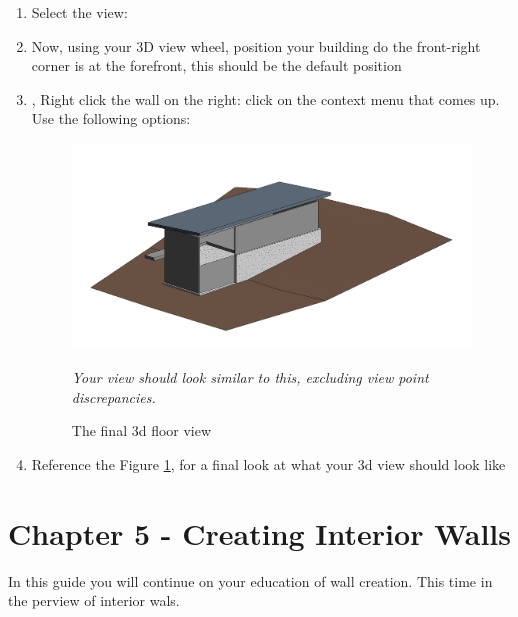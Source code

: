 \documentclass{tufte-book} %
\begin{document}
\begin{enumerate}
\begin{marginfigure}
		\caption[3D wall context menu]{What pops up here should be the caption menu when right clicking a wall. }
		\label{fig:revthreedfloorcontx}
	\end{marginfigure}
	\item Select the view:\\ 
	\item Now, using your 3D view wheel, position your building do the front-right corner is at the forefront, this should be the default position
	\item, Right click the wall on the right: click on the context menu that comes up. Use the following options: 
	\begin{figure}
		\includegraphics[width=\linewidth]{revit3dfloorview.png}
		\caption{The final 3d floor view}
		\emph{Your view should look similar to this, excluding view point discrepancies.}
		\label{fig:revthreedfloorfinal}
	\end{figure}
	\item Reference the Figure \ref{fig:revthreedfloorfinal}, for a final look at what your 3d view should look like
	 
\end{enumerate}

\chapter{Chapter 5 - Creating Interior Walls}
\label{ch:5}
In this guide you will continue on your education of wall creation. This time in the perview of interior wals.
\end{document}
